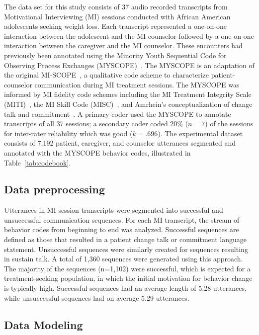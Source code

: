 The data set for this study consists of 37 audio recorded transcripts from Motivational Interviewing (MI) sessions conducted with African American adolescents seeking weight loss. Each transcript represented a one-on-one interaction between the adolescent and the MI counselor followed by a one-on-one interaction between the caregiver and the MI counselor. These encounters had previously been annotated using the Minority Youth Sequential Code for Observing Process Exchanges (MYSCOPE)~\cite{carcone2013provider}. The MYSCOPE is an adaptation of the original MI-SCOPE~\cite{martin2005motivational}, a qualitative code scheme to characterize patient-counselor communication during MI treatment sessions. The MYSCOPE was informed by MI fidelity code schemes including the MI Treatment Integrity Scale (MITI)~\cite{moyers2005assessing}, the MI Skill Code (MISC)~\cite{apodaca2007motivational}, and Amrhein's conceptualization of change talk and commitment~\cite{amrhein2004does}. A primary coder used the MYSCOPE to annotate transcripts of all 37 sessions; a secondary coder coded 20\% ($n = 7$) of the sessions for inter-rater reliability which was good ($k = .696$). The experimental dataset consists of 7,192 patient, caregiver, and counselor utterances segmented and annotated with the MYSCOPE behavior codes, illustrated in Table~\ref{tab:codebook}.

\subsection{Data preprocessing}
\label{subsec:datapreprocessing}
Utterances in MI session transcripts were segmented into successful and unsuccessful communication sequences. For each MI transcript, the stream of behavior codes from beginning to end was analyzed. Successful sequences are defined as those that resulted in a patient change talk or commitment language statement. Unsuccessful sequences were similarly created for sequences resulting in sustain talk. A total of 1,360 sequences were generated using this approach. The majority of the sequences (n=1,102) were successful, which is expected for a treatment-seeking population, in which the initial motivation for behavior change is typically high. Successful sequences had an average length of 5.28 utterances, while unsuccessful sequences had on average 5.29 utterances.  

\subsection{Data Modeling}
\label{subsec:dataModeling}
